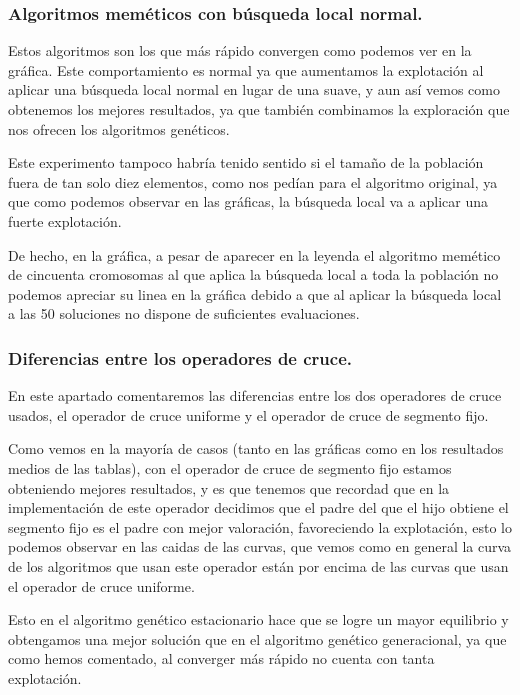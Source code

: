 \documentclass[12pt, spanish]{article}
\begin{document}
\subsubsection{Algoritmos meméticos con búsqueda local normal.}

Estos algoritmos  son los que más rápido convergen como podemos ver en la gráfica. Este comportamiento es normal ya que aumentamos la explotación al aplicar una búsqueda local normal en lugar de una suave, y aun así vemos como obtenemos los mejores resultados, ya que también combinamos la exploración que nos ofrecen los algoritmos genéticos.

Este experimento tampoco habría tenido sentido si el tamaño de la población fuera de tan solo diez elementos, como nos pedían para el algoritmo original, ya que como podemos observar en las gráficas, la búsqueda local va a aplicar una fuerte explotación.

De hecho, en la gráfica, a pesar de aparecer en la leyenda el algoritmo memético de cincuenta cromosomas al que aplica la búsqueda local a toda la población no podemos apreciar su linea en la gráfica debido a que al aplicar la búsqueda local a las 50 soluciones no dispone de suficientes evaluaciones.

\newpage

\subsubsection{Diferencias entre los operadores de cruce.}

En este apartado comentaremos las diferencias entre los dos operadores de cruce usados, el operador de cruce uniforme y el operador de cruce de segmento fijo.

Como vemos en la mayoría de casos (tanto en las gráficas como en los resultados medios de las tablas), con el operador de cruce de segmento fijo estamos obteniendo mejores resultados, y es que tenemos que recordad que en la implementación de este operador decidimos que el padre del que el hijo obtiene el segmento fijo es el padre con mejor valoración, favoreciendo la explotación, esto lo podemos observar en las caidas de las curvas, que vemos como en general la curva de los algoritmos que usan este operador están por encima de las curvas que usan el operador de cruce uniforme.

Esto en el algoritmo genético estacionario hace que se logre un mayor equilibrio y obtengamos una mejor solución que en el algoritmo genético generacional, ya que como hemos comentado, al converger más rápido no cuenta con tanta explotación.
\end{document}
